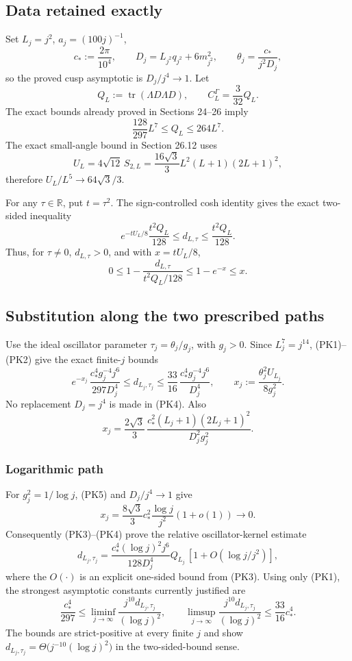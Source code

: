 \documentclass[
  11pt,
]{article}
\begin{document}
\subsection{Data retained exactly}\label{data-retained-exactly}

Set \(L_j=j^2\), \(a_j=(100j)^{-1}\), \[
 c_*:=\frac{2\pi}{10^4},\qquad
 D_j=L_{j^2}q_{j^2}+6m_{j^2}^2,\qquad
 \theta_j=\frac{c_*}{j^2D_j},
\] so the proved cusp asymptotic is \(D_j/j^4\to1\). Let \[
 Q_L:=\operatorname{tr}(\Lambda D\Lambda D),
 \qquad
 C_L^\Gamma=\frac3{32}Q_L.
\] The exact bounds already proved in Sections 24--26 imply \[
 \frac{128}{297}L^7\le Q_L\le264L^7. \tag{PK1}
\] The exact small-angle bound in Section 26.12 uses \[
 U_L=4\sqrt{12}\,S_{2,L}
 =\frac{16\sqrt3}{3}L^2(L+1)(2L+1)^2,
\] therefore \(U_L/L^5\to64\sqrt3/3\).

For any \(\tau\in\mathbb R\), put \(t=\tau^2\). The sign-controlled cosh
identity gives the exact two-sided inequality \[
 e^{-tU_L/8}\frac{t^2Q_L}{128}
 \le d_{L,\tau}
 \le\frac{t^2Q_L}{128}. \tag{PK2}
\] Thus, for \(\tau\ne0\), \(d_{L,\tau}>0\), and with \(x=tU_L/8\), \[
0\le1-\frac{d_{L,\tau}}{t^2Q_L/128}
 \le1-e^{-x}\le x. \tag{PK3}
\]

\subsection{Substitution along the two prescribed
paths}\label{substitution-along-the-two-prescribed-paths}

Use the ideal oscillator parameter \(\tau_j=\theta_j/g_j\), with
\(g_j>0\). Since \(L_j^7=j^{14}\), (PK1)--(PK2) give the exact
finite-\(j\) bounds \[
 e^{-x_j}\,\frac{c_*^4g_j^{-4}j^6}{297D_j^4}
 \le d_{L_j,\tau_j}
 \le \frac{33}{16}\,\frac{c_*^4g_j^{-4}j^6}{D_j^4},
 \qquad
 x_j:=\frac{\theta_j^2U_{L_j}}{8g_j^2}. \tag{PK4}
\] No replacement \(D_j=j^4\) is made in (PK4). Also \[
 x_j=\frac{2\sqrt3}{3}\,
 \frac{c_*^2(L_j+1)(2L_j+1)^2}{D_j^2g_j^2}. \tag{PK5}
\]

\subsubsection{Logarithmic path}\label{logarithmic-path}

For \(g_j^2=1/\log j\), (PK5) and \(D_j/j^4\to1\) give \[
 x_j=\frac{8\sqrt3}{3}c_*^2\frac{\log j}{j^2}(1+o(1))
 \longrightarrow0. \tag{PK6}
\] Consequently (PK3)--(PK4) prove the relative oscillator-kernel
estimate \[
 d_{L_j,\tau_j}
 =\frac{c_*^4(\log j)^2j^6}{128D_j^4}Q_{L_j}
 \,[1+O(\log j/j^2)], \tag{PK7}
\] where the \(O(\cdot)\) is an explicit one-sided bound from (PK3).
Using only (PK1), the strongest asymptotic constants currently justified
are \[
 \frac{c_*^4}{297}
 \le\liminf_{j\to\infty}\frac{j^{10}d_{L_j,\tau_j}}{(\log j)^2},
 \qquad
 \limsup_{j\to\infty}\frac{j^{10}d_{L_j,\tau_j}}{(\log j)^2}
 \le\frac{33}{16}c_*^4. \tag{PK8}
\] The bounds are strict-positive at every finite \(j\) and show
\(d_{L_j,\tau_j}=\Theta\big(j^{-10}(\log j)^2\big)\) in the
two-sided-bound sense.
\end{document}
